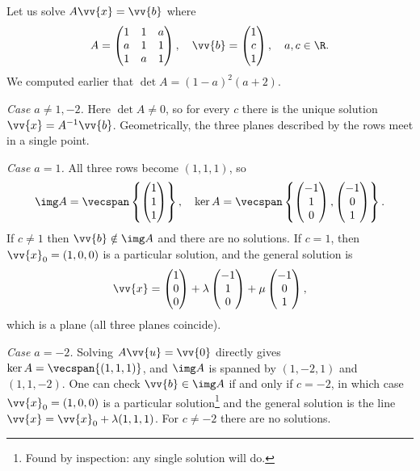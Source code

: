 \begin{example}
	Let us solve $A \vv{x} = \vv{b}$ where
	$$
	A = \begin{pmatrix}
		1 & 1 & a \\ a & 1 & 1 \\ 1 & a & 1
	\end{pmatrix}, \quad
	\vv{b} = \begin{pmatrix}
		1 \\ c \\ 1
	\end{pmatrix}, \quad a, c \in \R.
	$$
	We computed earlier that $\det A = (1 - a)^2(a + 2)$.

	\emph{Case $a \neq 1, -2$.} Here $\det A \neq 0$, so for every $c$ there is the unique solution $\vv{x} = A^{-1}\vv{b}$. Geometrically, the three planes described by the rows meet in a single point.

	\emph{Case $a = 1$.} All three rows become $(1, 1, 1)$, so
	$$
	\img A = \vecspan\left\{\begin{pmatrix} 1 \\ 1\\ 1\end{pmatrix}\right\}, \quad
	\ker A = \vecspan\left\{\begin{pmatrix} -1 \\ 1\\ 0\end{pmatrix}, \begin{pmatrix} -1 \\ 0\\ 1\end{pmatrix}\right\}.
	$$
	If $c \neq 1$ then $\vv{b} \notin \img A$ and there are no solutions. If $c = 1$, then $\vv{x}_0 = (1, 0, 0)$ is a particular solution, and the general solution is
	$$
	\vv{x} = \begin{pmatrix} 1 \\ 0 \\ 0\end{pmatrix} + \lambda \begin{pmatrix} -1 \\ 1 \\ 0\end{pmatrix} + \mu \begin{pmatrix} -1 \\ 0 \\ 1\end{pmatrix},
	$$
	which is a plane (all three planes coincide).

	\emph{Case $a = -2$.} Solving $A \vv{u} = \vv{0}$ directly gives $\ker A = \vecspan\{(1,1,1)\}$, and $\img A$ is spanned by $(1, -2, 1)$ and $(1, 1, -2)$. One can check $\vv{b} \in \img A$ if and only if $c = -2$, in which case $\vv{x}_0 = (1, 0, 0)$ is a particular solution\footnote{Found by inspection: any single solution will do.} and the general solution is the line $\vv{x} = \vv{x}_0 + \lambda(1,1,1)$. For $c \neq -2$ there are no solutions.
\end{example}


